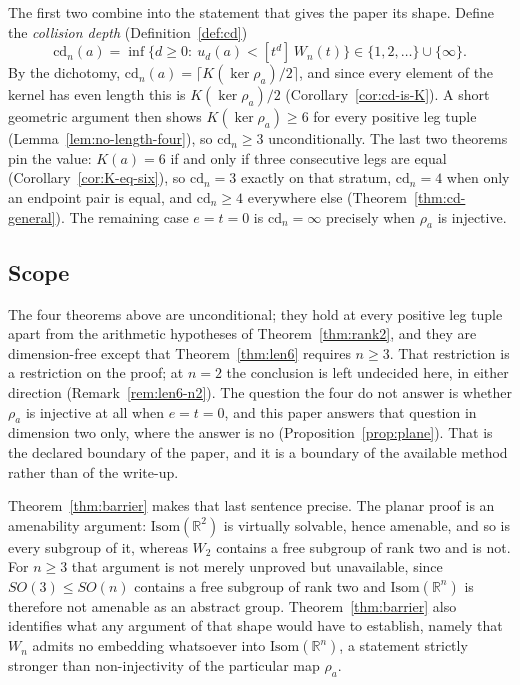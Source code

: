 \documentclass[11pt,a4paper]{article}
\newcommand{\R}{\mathbb{R}}
\newcommand{\Isom}{\mathrm{Isom}}
\newcommand{\cd}{\mathrm{cd}}
\theoremstyle{definition}
\theoremstyle{remark}
\theoremstyle{plain}
\begin{document}
The first two combine into the statement that gives the paper its shape. Define the
\emph{collision depth} (Definition~\ref{def:cd})
\[
\cd_n(a)=\inf\bigl\{d\ge0:\ u_d(a)<[t^d]\,W_n(t)\bigr\}\in\{1,2,\dots\}\cup\{\infty\}.
\]
By the dichotomy, $\cd_n(a)=\lceil K(\ker\rho_a)/2\rceil$, and since every element of the
kernel has even length this is $K(\ker\rho_a)/2$ (Corollary~\ref{cor:cd-is-K}). A short geometric
argument then shows $K(\ker\rho_a)\ge6$ for every positive leg tuple
(Lemma~\ref{lem:no-length-four}), so $\cd_n\ge3$ unconditionally. The last two theorems pin the
value: $K(a)=6$ if and only if three consecutive legs are equal
(Corollary~\ref{cor:K-eq-six}), so $\cd_n=3$ exactly on that stratum, $\cd_n=4$ when only an
endpoint pair is equal, and $\cd_n\ge4$ everywhere else (Theorem~\ref{thm:cd-general}). The
remaining case $e=t=0$ is $\cd_n=\infty$ precisely when $\rho_a$ is injective.

\subsection{Scope}\label{subsec:scope}

The four theorems above are unconditional; they hold at every positive leg tuple apart from
the arithmetic hypotheses of Theorem~\ref{thm:rank2}, and they are dimension-free except that
Theorem~\ref{thm:len6} requires $n\ge3$. That restriction is a restriction on the proof; at
$n=2$ the conclusion is left undecided here, in either direction
(Remark~\ref{rem:len6-n2}). The question the four do not answer is whether $\rho_a$ is
injective at all when $e=t=0$, and this paper answers that question in dimension two only,
where the answer is no (Proposition~\ref{prop:plane}). That is the declared boundary of the
paper, and it is a boundary of the available method rather than of the write-up.

Theorem~\ref{thm:barrier} makes that last sentence precise. The planar proof is an amenability
argument: $\Isom(\R^2)$ is virtually solvable, hence amenable, and so is every subgroup of it,
whereas $W_2$ contains a free subgroup of rank two and is not. For $n\ge3$ that argument is not
merely unproved but unavailable, since $SO(3)\le SO(n)$ contains a free subgroup of rank two
and $\Isom(\R^n)$ is therefore not amenable as an abstract group.
Theorem~\ref{thm:barrier} also identifies what any argument of that shape would have to
establish, namely that $W_n$ admits no embedding whatsoever into $\Isom(\R^n)$, a statement
strictly stronger than non-injectivity of the particular map $\rho_a$.
\end{document}
